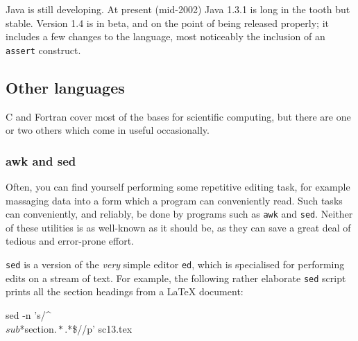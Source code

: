 \documentclass[11pt,oneside,chapters]{starlink}
\begin{document}
Java is still developing.  At present (mid-2002) Java
1.3.1 is long in the tooth but stable.  Version 1.4 is in
beta, and on the point of being released properly; it
includes a few changes to the language, most noticeably
the inclusion of an \texttt{assert} construct.


\subsection{Other languages}
\label{s:otherlang}

C and Fortran cover most of the bases for scientific computing, but
there are one or two others which come in useful occasionally.

\subsubsection{awk and sed}
\label{s:sedawk}

Often, you can find yourself performing some repetitive
editing task, for example massaging data into a form
which a program can conveniently read.  Such tasks can
conveniently, and reliably, be done by programs such as
\texttt{awk} and \texttt{sed}.  Neither of these
utilities is as well-known as it should be, as they can
save a great deal of tedious and error-prone effort.

\texttt{sed} is a version of the \emph{very}
simple editor \texttt{ed}, which is specialised for
performing edits on a stream of text.  For example, the
following rather elaborate \texttt{sed} script
prints all the section headings from a LaTeX document:

\begin{terminalv}
sed -n 's/^\\\(sub\)*section{\(.*\)}.*\$/\2/p' sc13.tex
\end{terminalv}
\end{document}
